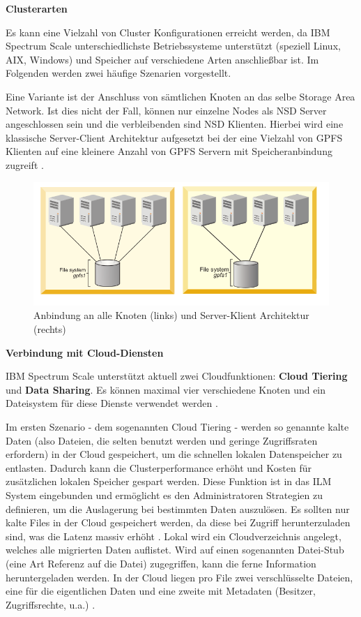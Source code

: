 \textbf{Clusterarten}

Es kann eine Vielzahl von Cluster Konfigurationen erreicht werden, da IBM Spectrum Scale unterschiedlichste Betriebssysteme unterstützt (speziell Linux, AIX, Windows) und Speicher auf verschiedene Arten anschließbar ist. Im Folgenden werden zwei häufige Szenarien vorgestellt.

Eine Variante ist der Anschluss von sämtlichen Knoten an das selbe Storage Area Network. Ist dies nicht der Fall, können nur einzelne Nodes als \ac{NSD} Server angeschlossen sein und die verbleibenden sind \ac{NSD} Klienten. Hierbei wird eine klassische Server-Client Architektur aufgesetzt bei der eine Vielzahl von GPFS Klienten auf eine kleinere Anzahl von GPFS Servern mit Speicheranbindung zugreift \parencite[S. 8]{ibm.2017}.

\begin{figure}[hbt]
	\centering
	\includegraphics[scale=0.6]{images/gpfs-architectures}
	\caption{Anbindung an alle Knoten (links) und Server-Klient Architektur (rechts) \parencite[S. 8]{ibm.2017}}
	\label{fig:gpfsarchitecture}
\end{figure}

\textbf{Verbindung mit Cloud-Diensten}

IBM Spectrum Scale unterstützt aktuell zwei Cloudfunktionen: \textbf{Cloud Tiering} und \textbf{Data Sharing}. Es können maximal vier verschiedene Knoten und ein Dateisystem für diese Dienste verwendet werden \parencite{mani.2017}.

Im ersten Szenario - dem sogenannten Cloud Tiering - werden so genannte kalte Daten (also Dateien, die selten benutzt werden und geringe Zugriffsraten erfordern) in der Cloud gespeichert, um die schnellen lokalen Datenspeicher zu entlasten. Dadurch kann die Clusterperformance erhöht und Kosten für zusätzlichen lokalen Speicher gespart werden. Diese Funktion ist in das \ac{ILM} System eingebunden und ermöglicht es den Administratoren Strategien zu definieren, um die Auslagerung bei bestimmten Daten auszulösen.
Es sollten nur kalte Files in der Cloud gespeichert werden, da diese bei Zugriff herunterzuladen sind, was die Latenz massiv erhöht \parencite[S. 107]{ibm.2017}.
Lokal wird ein Cloudverzeichnis angelegt, welches alle migrierten Daten auflistet. Wird auf einen sogenannten Datei-Stub (eine Art Referenz auf die Datei) zugegriffen, kann die ferne Information heruntergeladen werden. In der Cloud liegen pro File zwei verschlüsselte Dateien, eine für die eigentlichen Daten und eine zweite mit Metadaten (Besitzer, Zugriffsrechte, u.a.) \parencite[S. 108]{ibm.2017}.

